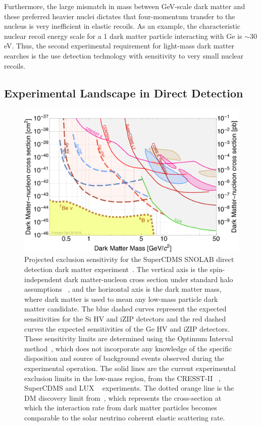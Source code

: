 Furthermore, the large mismatch in mass between GeV-scale dark matter and these preferred heavier nuclei dictates that four-momentum transfer to the nucleus is very inefficient in elastic recoils.  As an example, the characteristic nuclear recoil energy scale for a 1 \gev dark matter particle interacting with Ge is $\sim$30 eV. Thus, the second experimental requirement for light-mass dark matter searches is the use detection technology with sensitivity to very small nuclear recoils.

\subsection{Experimental Landscape in Direct Detection}

\begin{figure}
\centering
\includegraphics[width=\hsize]{Figures/SuperCDMS_Projected_Limits_squat.pdf}
\caption{\footnotesize Projected exclusion sensitivity for the SuperCDMS SNOLAB direct detection dark matter experiment~\cite{SuperCDMSSensitvitiy:2016arXiv}. The vertical axis is the spin-independent dark matter-nucleon cross section under standard halo assumptions ~\cite{Lewin:1995rx}, and the horizontal axis is the dark matter mass, where dark matter is used to mean any low-mass particle dark matter candidate. The blue dashed curves represent the expected sensitivities for the Si HV and iZIP detectors and the red dashed curves the expected sensitivities of the Ge HV and iZIP detectors. These sensitivity limits are determined using the Optimum Interval method~\cite{Yellin:2002xd}, which does not incorporate any knowledge of the specific disposition and source of background events observed during the experimental operation. The solid lines are the current experimental exclusion limits in the low-mass region, from the CRESST-II ~\cite{2012EPJC...72.1971A}, SuperCDMS \cite{Agnese:2014aze,Agnese:2015nto} and LUX ~\cite{Akerib:2015rjg} experiments. The dotted orange line is the DM discovery limit from~\cite{Ruppin:2014bra}, which represents the cross-section at which the interaction rate from dark matter particles becomes comparable to the solar neutrino coherent elastic scattering rate.
}
\label{fig:SIdataProjections}
\end{figure}


